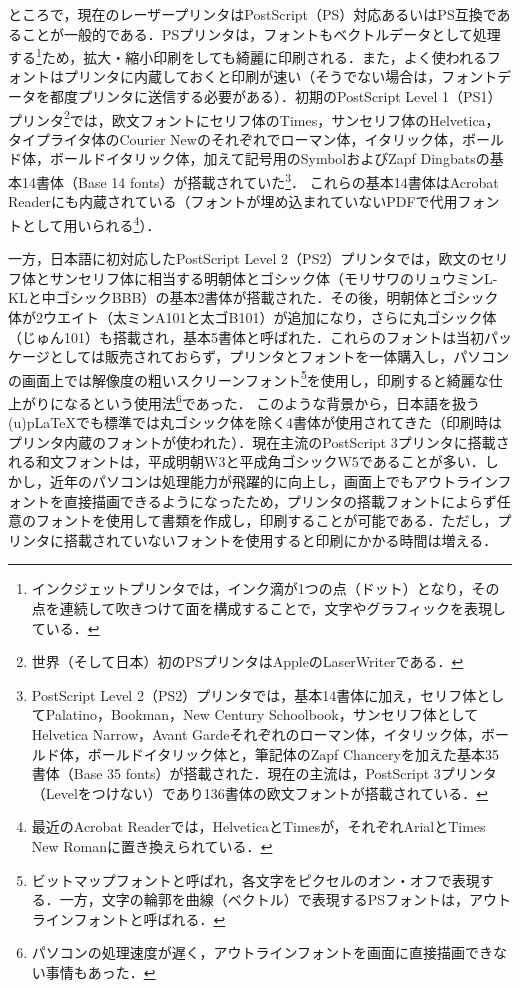 ところで，現在のレーザープリンタはPostScript（PS）対応あるいはPS互換であることが一般的である．PSプリンタは，フォントもベクトルデータとして処理する\footnote{インクジェットプリンタでは，インク滴が1つの点（ドット）となり，その点を連続して吹きつけて面を構成することで，文字やグラフィックを表現している．}ため，拡大・縮小印刷をしても綺麗に印刷される．また，よく使われるフォントはプリンタに内蔵しておくと印刷が速い（そうでない場合は，フォントデータを都度プリンタに送信する必要がある）．初期のPostScript Level 1（PS1）プリンタ\footnote{世界（そして日本）初のPSプリンタはAppleのLaserWriterである．}では，欧文フォントにセリフ体のTimes，サンセリフ体のHelvetica，タイプライタ体のCourier Newのそれぞれでローマン体，イタリック体，ボールド体，ボールドイタリック体，加えて記号用のSymbolおよびZapf Dingbatsの基本14書体（Base 14 fonts）が搭載されていた\footnote{PostScript Level 2（PS2）プリンタでは，基本14書体に加え，セリフ体としてPalatino，Bookman，New Century Schoolbook，サンセリフ体としてHelvetica Narrow，Avant Gardeそれぞれのローマン体，イタリック体，ボールド体，ボールドイタリック体と，筆記体のZapf Chanceryを加えた基本35書体（Base 35 fonts）が搭載された．現在の主流は，PostScript 3プリンタ（Levelをつけない）であり136書体の欧文フォントが搭載されている．}．
これらの基本14書体はAcrobat Readerにも内蔵されている（フォントが埋め込まれていないPDFで代用フォントとして用いられる\footnote{最近のAcrobat Readerでは，HelveticaとTimesが，それぞれArialとTimes New Romanに置き換えられている．}）．

一方，日本語に初対応したPostScript Level 2（PS2）プリンタでは，欧文のセリフ体とサンセリフ体に相当する明朝体とゴシック体（モリサワのリュウミンL-KLと中ゴシックBBB）の基本2書体が搭載された．その後，明朝体とゴシック体が2ウエイト（太ミンA101と太ゴB101）が追加になり，さらに丸ゴシック体（じゅん101）も搭載され，基本5書体と呼ばれた．これらのフォントは当初パッケージとしては販売されておらず，プリンタとフォントを一体購入し，パソコンの画面上では解像度の粗いスクリーンフォント\footnote{ビットマップフォントと呼ばれ，各文字をピクセルのオン・オフで表現する．一方，文字の輪郭を曲線（ベクトル）で表現するPSフォントは，アウトラインフォントと呼ばれる．}を使用し，印刷すると綺麗な仕上がりになるという使用法\footnote{パソコンの処理速度が遅く，アウトラインフォントを画面に直接描画できない事情もあった．}であった．
このような背景から，日本語を扱う(u)p{\LaTeX}でも標準では丸ゴシック体を除く4書体が使用されてきた（印刷時はプリンタ内蔵のフォントが使われた）．現在主流のPostScript 3プリンタに搭載される和文フォントは，平成明朝W3と平成角ゴシックW5であることが多い．しかし，近年のパソコンは処理能力が飛躍的に向上し，画面上でもアウトラインフォントを直接描画できるようになったため，プリンタの搭載フォントによらず任意のフォントを使用して書類を作成し，印刷することが可能である．ただし，プリンタに搭載されていないフォントを使用すると印刷にかかる時間は増える．

